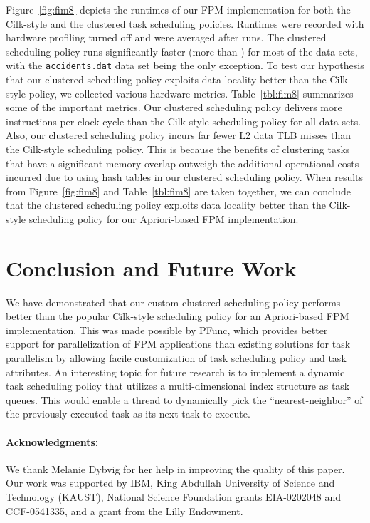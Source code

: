 \documentclass{IOS-Book-Article}
\newcommand{\code}[1]{\lstinline[basicstyle=\sffamily]{#1}}
\begin{document}
Figure~\ref{fig:fim8} depicts the runtimes of our FPM implementation for both
the Cilk-style and the clustered task scheduling policies. Runtimes were
recorded with hardware profiling turned off and were averaged after  runs.
The clustered scheduling policy runs significantly faster (more than )
for most of the data sets, with the \code{accidents.dat} data set being the
only exception. To test our hypothesis that our clustered scheduling policy
exploits data locality better than the Cilk-style policy, we collected
various hardware metrics.  Table~\ref{tbl:fim8} summarizes some of the
important metrics. Our clustered scheduling policy delivers more instructions
per clock cycle than the Cilk-style scheduling policy for all data sets.
Also, our clustered scheduling policy incurs far fewer L2 data TLB misses
than the Cilk-style scheduling policy. This is because the benefits of
clustering tasks that have a significant memory overlap outweigh the
additional operational costs incurred due to using hash tables in our
clustered scheduling policy.
When results from Figure~\ref{fig:fim8} and Table~\ref{tbl:fim8} are taken
together, we can conclude that the clustered scheduling policy exploits
data locality better than the Cilk-style scheduling policy for our
Apriori-based FPM implementation.

\section{Conclusion and Future Work}
We have demonstrated that our custom clustered scheduling policy performs
better than the popular Cilk-style scheduling policy for an Apriori-based FPM
implementation. This was made possible by PFunc, which provides better support
for parallelization of FPM applications than existing solutions for task
parallelism by allowing facile customization of task scheduling policy and
task attributes. An interesting topic for future research is to implement a
dynamic task scheduling policy that utilizes a multi-dimensional index
structure as task queues.  This would enable a thread to dynamically pick the
``nearest-neighbor'' of the previously executed task as its next task to
execute. 

\paragraph{\textbf{Acknowledgments:}}
We thank Melanie Dybvig for her help in improving the quality of this paper.
Our work was supported by IBM, King Abdullah University of Science and
Technology (KAUST), National Science Foundation grants EIA-0202048 and
CCF-0541335, and a grant from the Lilly Endowment.



\end{document}
